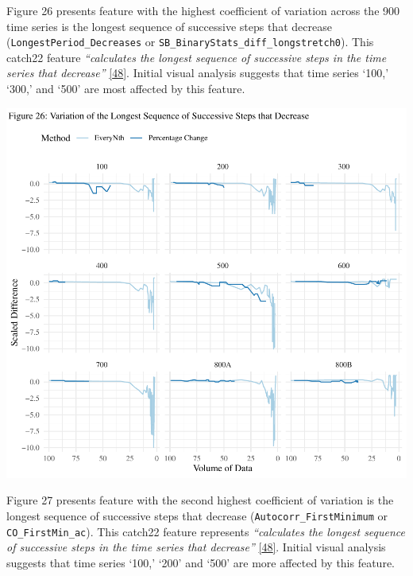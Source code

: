 \documentclass{article}
\begin{document}
Figure 26 presents feature with the highest coefficient of variation
across the 900 time series is the longest sequence of successive steps
that decrease (\texttt{LongestPeriod\_Decreases} or
\texttt{SB\_BinaryStats\_diff\_longstretch0}). This catch22 feature
\emph{``calculates the longest sequence of successive steps in the time
series that decrease''} \protect\hyperlink{ref-feature_book}{{[}48{]}}.
Initial visual analysis suggests that time series `100,' `300,' and
`500' are most affected by this feature.

\includegraphics{210431461_CSC8639_Dissertation_files/figure-latex/LongestDecrease-1.pdf}

\newpage

Figure 27 presents feature with the second highest coefficient of
variation is the longest sequence of successive steps that decrease
(\texttt{Autocorr\_FirstMinimum} or \texttt{CO\_FirstMin\_ac}). This
catch22 feature represents \emph{``calculates the longest sequence of
successive steps in the time series that decrease''}
\protect\hyperlink{ref-feature_book}{{[}48{]}}. Initial visual analysis
suggests that time series `100,' `200' and `500' are more affected by
this feature.
\end{document}
